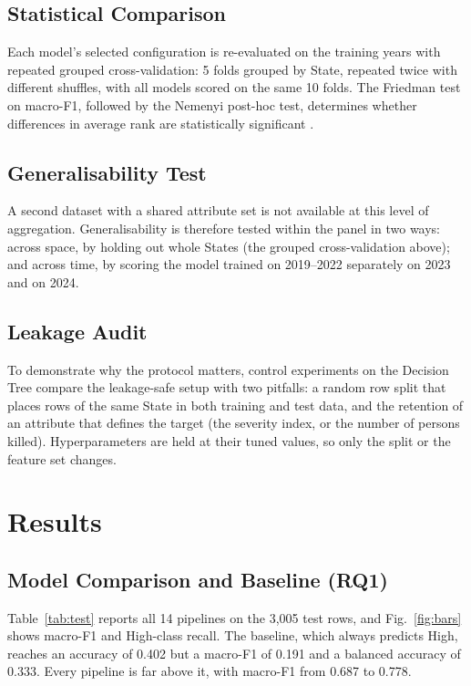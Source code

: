 \documentclass[conference]{IEEEtran}
\begin{document}
\subsection{Statistical Comparison}
Each model's selected configuration is re-evaluated on the training years with repeated grouped cross-validation: 5 folds grouped by State, repeated twice with different shuffles, with all models scored on the same 10 folds. The Friedman test on macro-F1, followed by the Nemenyi post-hoc test, determines whether differences in average rank are statistically significant \cite{demsar2006}.

\subsection{Generalisability Test}
A second dataset with a shared attribute set is not available at this level of aggregation. Generalisability is therefore tested within the panel in two ways: across space, by holding out whole States (the grouped cross-validation above); and across time, by scoring the model trained on 2019--2022 separately on 2023 and on 2024.

\subsection{Leakage Audit}
To demonstrate why the protocol matters, control experiments on the Decision Tree compare the leakage-safe setup with two pitfalls: a random row split that places rows of the same State in both training and test data, and the retention of an attribute that defines the target (the severity index, or the number of persons killed). Hyperparameters are held at their tuned values, so only the split or the feature set changes.

\section{Results}
\label{sec:results}

\subsection{Model Comparison and Baseline (RQ1)}
Table~\ref{tab:test} reports all 14 pipelines on the 3,005 test rows, and Fig.~\ref{fig:bars} shows macro-F1 and High-class recall. The baseline, which always predicts High, reaches an accuracy of 0.402 but a macro-F1 of 0.191 and a balanced accuracy of 0.333. Every pipeline is far above it, with macro-F1 from 0.687 to 0.778.
\end{document}
